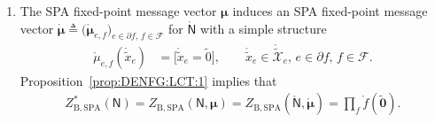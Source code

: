 \documentclass[journal]{IEEEtran}
\newcommand{\vect}[1]{ \bm{#1} }
\newcommand{\setF}{ \mathcal{F} }
\newcommand{\setpf}{ \partial f }
\newcommand{\vmu}{ \vect{ \mu } }
\newcommand{\graphN}{ \mathsf{N} }
\newcommand{\defeq}{ \triangleq }
\newcommand{\ZBSPA}{ Z_{\mathrm{B,SPA}} }
\newcommand{\LCTtset}[1]{\mathring{\tilde{\mathcal{#1}}}}
\newcommand{\LCTv}[1]{ \mathring{ \vect{#1} } }
\newcommand{\LCT}[1]{ \mathring{#1} }
\newcommand{\LCTt}[1]{ \mathring{ \tilde{#1} } }
\newcommand{\ef}{ e,f }
\newcommand{\tzero}{\tilde{0}}
\newcommand{\tv}[1]{ \tilde{\vect{#1}} }
\begin{document}
\begin{enumerate}
  \item The SPA fixed-point message vector $\vmu$ induces an SPA
        fixed-point message vector
        $\LCTv{\mu} \defeq \bigl( \LCTv{\mu}_{\ef} \bigr)_{ \! e \in \setpf,\,
            f \in \setF}$ for $\LCT{\graphN}$ with a simple structure
        \begin{align*}
          \LCT{\mu}_{e,f}(\LCTt{x}_{e})
           & = \bigl[ \LCTt{x}_{e} \! = \! \tzero \bigr],
          \qquad
          \LCTt{x}_{e} \in \LCTtset{X}_{e}, \,
          e \in \setpf, \, f \in \setF.
        \end{align*}
        Proposition~\ref{prop:DENFG:LCT:1} implies that
        \begin{align}
          \ZBSPA^{*}(\graphN)
          = \ZBSPA(\graphN,\vmu)
          = \ZBSPA(\LCT{\graphN}, \LCTv{\mu})
          =
          \prod_{f} \LCT{f}(\tv{0}).
          \label{sec:CheckCon:eqn:31}
        \end{align}
\end{enumerate}
\end{document}
